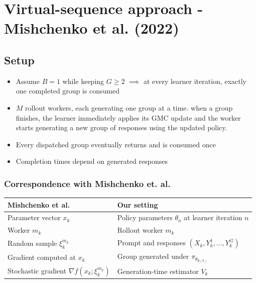 \section{Virtual-sequence approach -  Mishchenko
et al. (2022)}

\subsection{Setup}

\begin{itemize}
    \item Assume $B=1$ while keeping $G\geq 2$ $\implies$ at every learner iteration, exactly one completed
group is consumed
    \item $M$ rollout workers, each generating one group at a time. when a group finishes, the learner immediately applies its GMC update and the worker starts generating a new group of responses using the updated policy.
    \item Every dispatched group eventually returns and is consumed once
    \item Completion times depend on generated responses
\end{itemize}


\subsubsection{Correspondence with Mishchenko et. al.}

\begin{tabular}[t]{|l|l|}
\hline Mishchenko et al. & Our setting \\
\hline Parameter vector $x_k$ & Policy parameters $\theta_n$ at learner iteration $n$ \\
\hline Worker $m_k$ & Rollout worker $m_k$ \\
\hline Random sample $\xi_k^{m_k}$ & Prompt and responses $\left(X_k, Y_k^1, \ldots, Y_k^G\right)$ \\
\hline Gradient computed at $x_k$ & Group generated under $\pi_{\theta_{d(k)}}$ \\
\hline Stochastic gradient $\nabla f\left(x_k ; \xi_k^{m_k}\right)$ & Generation-time estimator $V_k$ \\
\hline
\end{tabular}

